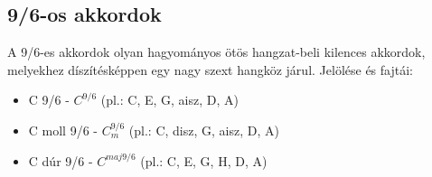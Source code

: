 \subsection{9/6-os akkordok}
A 9/6-es akkordok olyan hagyományos ötös hangzat-beli kilences akkordok, melyekhez díszítésképpen
egy nagy szext hangköz járul.
Jelölése és fajtái:
\begin{itemize}
\item C 9/6 - $C^{9/6}$ (pl.: C, E, G, aisz, D, A)
\item C moll 9/6 - $C_m^{9/6}$ (pl.: C, disz, G, aisz, D, A)
\item C dúr 9/6 - $C^{maj9/6}$ (pl.: C, E, G, H, D, A)
\end{itemize}


